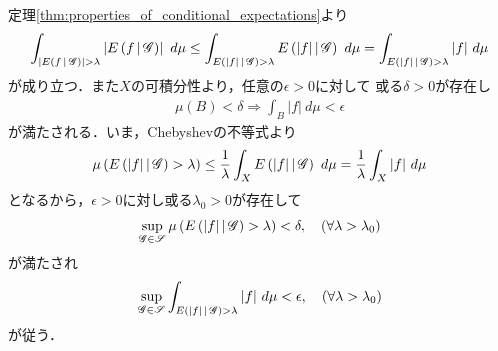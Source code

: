 	\begin{prf}
		定理\ref{thm:properties_of_conditional_expectations}より
				\begin{align}
					\int_{\left| \cexp{f}{\mathscr{G}} \right| > \lambda} \left| \cexp{f}{\mathscr{G}} \right|\ d\mu
					\leq \int_{\cexp{|f|}{\mathscr{G}} > \lambda} \cexp{|f|}{\mathscr{G}}\ d\mu
					= \int_{\cexp{|f|}{\mathscr{G}} > \lambda} |f|\ d\mu
				\end{align}
				が成り立つ．また$X$の可積分性より，任意の$\epsilon > 0$に対して
				或る$\delta > 0$が存在し
				\begin{align}
					\mu(B) < \delta \Rightarrow \int_B |f|\ d\mu < \epsilon
				\end{align}
				が満たされる．いま，Chebyshevの不等式より
				\begin{align}
					\mu\left( E\left( |f| \, \middle|\, \mathscr{G} \right) > \lambda \right)
					\leq \frac{1}{\lambda} \int_X E\left( |f| \, \middle|\, \mathscr{G} \right)\ d\mu
					= \frac{1}{\lambda} \int_X |f|\ d\mu
				\end{align}
				となるから，$\epsilon > 0$に対し或る$\lambda_0 > 0$が存在して
				\begin{align}
					\operatorname*{sup}_{\mathscr{G} \in \mathscr{S}} \mu\left( E\left( |f| \, \middle|\, \mathscr{G} \right) > \lambda \right)
					< \delta,
					\quad (\forall \lambda > \lambda_0)
				\end{align}
				が満たされ
				\begin{align}
					\operatorname*{sup}_{\mathscr{G} \in \mathscr{S}} \int_{E\left( |f| \, \middle|\, \mathscr{G} \right) > \lambda}|f|\ d\mu
					< \epsilon,
					\quad (\forall \lambda > \lambda_0)
				\end{align}
				が従う．
		\QED
	\end{prf}
